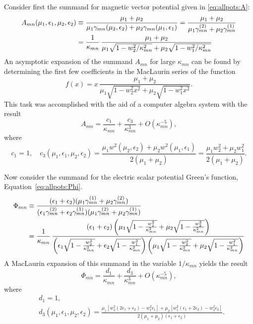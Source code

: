 Consider first the summand for  magnetic vector potential given in
\eqref{eq:allpots:A}:
\begin{align}
  A_{mn}(\mu_1,\epsilon_1,\mu_2,\epsilon_2) &\equiv   
  \frac{\mu_1 + \mu_2}%
  {\mu_1\gamma_{mn}(\mu_2,\epsilon_2) +
    \mu_2\gamma_{mn}(\mu_1,\epsilon_1)} 
  =
  \frac{\mu_1 + \mu_2}%
  {\mu_1\gamma\two_{mn}+\mu_2\gamma\one_{mn}} \nonumber \\
  &= \frac{1}{\kappa_{mn}} \,
  \frac{\mu_1 + \mu_2}%
  {\mu_1 \sqrt{1-w_2^2/\kappa_{mn}^2} +
    \mu_2 \sqrt{1-w_1^2/\kappa_{mn}^2}} \nonumber \\
\end{align}
An asymptotic expansion of the summand $A_{mn}$ for large
$\kappa_{mn}$ can be found by determining the first few coefficients
in the MacLaurin series of the function
\begin{equation}
  \label{eq:AMac}
  f(x) = x \,
  \frac{\mu_1 + \mu_2}%
  {\mu_1 \sqrt{1-w_2^2 x^2} +
    \mu_2 \sqrt{1-w_1^2 x^2}}.
\end{equation}
This task was accomplished with the aid of a computer algebra
system with the result
\begin{equation}
  \label{eq:Aasymp}
  A_{mn} = \frac{c_1}{\kappa_{mn}} + 
  \frac{c_3}{\kappa_{mn}^{3}} + O(\kappa_{mn}^{-5}),
\end{equation}
where
\begin{equation}
  c_1 = 1, \quad c_3(\mu_1,\epsilon_1,\mu_2,\epsilon_2) 
  = \frac{\mu_1 w^2(\mu_2,\epsilon_2) + \mu_2 w^2(\mu_1,\epsilon_1)}{2(\mu_1 + \mu_2)}
  =\frac{\mu_1 w_2^2 + \mu_2 w_1^2}{2(\mu_1 + \mu_2)}.
\end{equation}

Now consider the summand for the electric scalar potential Green's
function, Equation~\eqref{eq:allpots:Phi}.
  \newcommand{\fac}[1]{\sqrt{1-\frac{w_{#1}^2}{\kappa_{mn}^2}}}
\begin{align}
  \Phi_{mn} &\equiv 
  \frac{(\epsilon_1+\epsilon_2)
    (\mu_1\gamma\one_{mn} + \mu_2\gamma\two_{mn})}%
  {(\epsilon_1\gamma\two_{mn}+\epsilon_2\gamma\one_{mn})
    (\mu_1\gamma\two_{mn}+\mu_2\gamma\one_{mn}) }  \nonumber \\
  &= 
  \frac{1}{\kappa_{mn}} \,
  \frac{(\epsilon_1+\epsilon_2)\left(\mu_1\fac1 + \mu_2\fac2\right)}%
  {\left(\epsilon_1\fac2 + \epsilon_2\fac1\right) \left(\mu_1\fac2+\mu_2\fac1\right) }
\end{align}
A MacLaurin expansion of this summand in the variable $1/\kappa_{mn}$
yields the result
\begin{equation}
  \label{eq:Phiasymp}
  \Phi_{mn} = \frac{d_1}{\kappa_{mn}} + 
  \frac{d_3}{\kappa_{mn}^{3}} + O(\kappa_{mn}^{-5}),
\end{equation}
where
\begin{subequations}
  \begin{align}
    &d_1 = 1, \\
    &d_3(\mu_1,\epsilon_1,\mu_2,\epsilon_2) = 
    \frac{\mu_1[w_2^2(2\epsilon_1+\epsilon_2)-w_1^2\epsilon_1] 
      + \mu_2[w_1^2(\epsilon_1+2\epsilon_2)-w_2^2\epsilon_2]}%
    {2(\mu_1+\mu_2)(\epsilon_1+\epsilon_2)}.
  \end{align}
\end{subequations}

